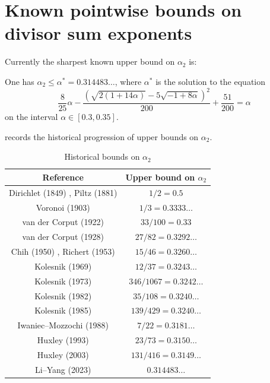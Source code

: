 \section{Known pointwise bounds on divisor sum exponents}

Currently the sharpest known upper bound on $\alpha_2$ is:

\begin{theorem}\label{divisor-2-bound}\cite[Theorem 1.2]{li_yang_gauss_2024} One has $\alpha_2 \leq \alpha^* = 0.314483\ldots$, where $\alpha^*$ is the solution to the equation
\[
\frac{8}{25}\alpha - \frac{(\sqrt{2(1+14\alpha)} - 5\sqrt{-1+8\alpha})^2}{200} + \frac{51}{200} = \alpha
\]
on the interval $\alpha \in [0.3, 0.35]$.
\end{theorem}

 records the historical progression of upper bounds on $\alpha_2$.

\begin{table}[ht]
    \def\arraystretch{1.2}
    \centering
    \caption{Historical bounds on $\alpha_2$}
    \begin{tabular}{|c|c|}
    \hline
    Reference & Upper bound on $\alpha_2$\\
    \hline
    Dirichlet (1849) \cite{dirichlet_bestimmung_1849}, Piltz (1881) \cite{piltz_gesetz_1881} & $1/2 = 0.5$\\
    \hline
    Voronoi (1903) \cite{voronoi_sur_1903} & $1/3 = 0.3333\ldots$\\
    \hline
    van der Corput (1922) \cite{van_der_corput_verscharfung_1922} & $33/100 = 0.33$\\
    \hline
    van der Corput (1928) \cite{van_der_corput_zum_1928} & $27/82 = 0.3292\ldots$\\
    \hline
    Chih (1950) \cite{chih_on_1950}, Richert (1953) \cite{richert_verschrfung_1953} & $15/46 = 0.3260\ldots$\\
    \hline
    Kolesnik (1969) \cite{kolesnik_improvement_1969} & $12/37 = 0.3243\ldots$\\
    \hline
    Kolesnik (1973) \cite{kolesnik_1973} & $346/1067 = 0.3242\ldots$\\
    \hline
    Kolesnik (1982) \cite{kolesnik_order_1982} & $35/108 = 0.3240\ldots$\\
    \hline
    Kolesnik (1985) \cite[p. 118]{kolesnik_1985} & $139/429 = 0.3240\ldots$\\
    \hline
    Iwaniec--Mozzochi (1988) \cite{iwaniec_divisor_1988} & $7/22 = 0.3181\ldots$\\
    \hline
    Huxley (1993) \cite{huxley_exponential_1993} & $23/73 = 0.3150\ldots$\\
    \hline
    Huxley (2003) \cite{huxley_exponential_2003} & $131/416 = 0.3149\ldots$\\
    \hline
    Li--Yang (2023) \cite{li_yang_gauss_2024} & $0.314483\ldots$\\
    \hline
    \end{tabular}
\label{div-alpha2-table}
\end{table}

